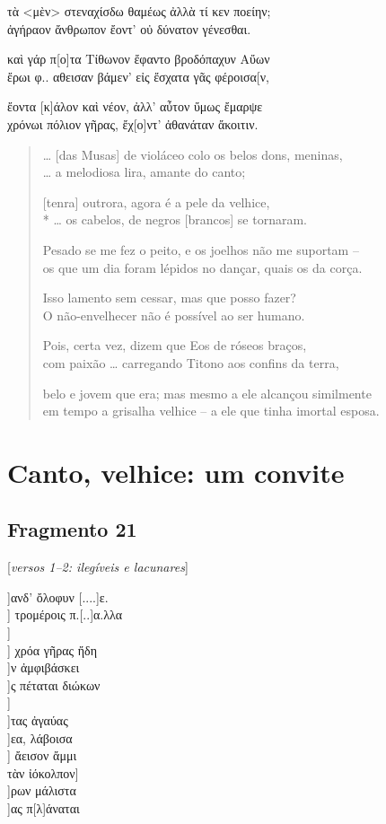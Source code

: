 {\begin{gkverse}
τὰ <μὲν> στεναχίσδω θαμέως ἀλλὰ τί κεν ποείην;\\
ἀγήραον ἄνθρωπον ἔοντ’ οὐ δύνατον γένεσθαι.

καὶ γάρ π[ο]τα Τίθωνον ἔφαντο βροδόπαχυν Αὔων\\
ἔρωι φ..  αθεισαν βάμεν’ εἰς ἔσχατα γᾶς φέροισα[ν,

ἔοντα [κ]άλον καὶ νέον, ἀλλ’ αὖτον ὔμως ἔμαρψε\\
χρόνωι πόλιον γῆρας, ἔχ[ο]ντ’ ἀθανάταν ἄκοιτιν.
\end{gkverse}

\begin{verse}
\ldots{} [das Musas] de violáceo colo os belos dons, meninas,\\
\ldots{} a melodiosa lira, amante do canto;

[tenra] outrora, agora é a pele da velhice,\\*
\ldots{} os cabelos, de negros [brancos] se tornaram.


Pesado se me fez o peito, e os joelhos não me suportam -- \\
os que um dia foram lépidos no dançar, quais os da corça.

Isso lamento sem cessar, mas que posso fazer?\\
O não-envelhecer não é possível ao ser humano.

Pois, certa vez, dizem que Eos de róseos braços,\\
com paixão \ldots{} carregando Titono aos confins da terra,

belo e jovem que era; mas mesmo a ele alcançou similmente\\
em tempo a grisalha velhice -- a ele que tinha imortal esposa.
\end{verse}

\chapter{Canto, velhice: um convite}


\section{Fragmento 21}

\begin{gkverse}
\textnormal{[\textit{versos 1--2: ilegíveis e lacunares}]}

]ανδ’ ὄλοφυν [....]ε.\\
] τρομέροις π.[..]α.λλα\\
]\\
  ] χρόα γῆρας ἤδη\\
   ]ν ἀμφιβάσκει\\
     ]ς πέταται διώκων\\
     ]\\
     ]τας ἀγαύας\\
   ]εα, λάβοισα\\
   ] ἄεισον ἄμμι\\
τὰν ἰόκολπον\qquad         ]\\
        ]ρων μάλιστα\\
         ]ας π[λ]άναται
\end{gkverse}


}
